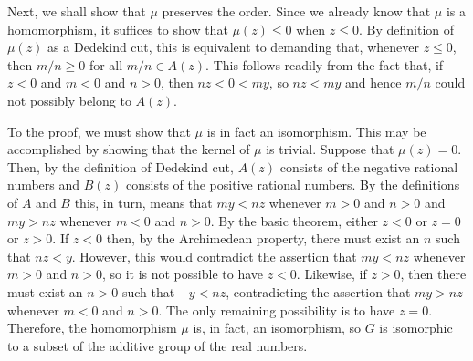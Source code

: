 \documentclass[12pt]{article}
\begin{document}
Next, we shall show that $\mu$ preserves the order.  Since we already know that $\mu$ is a homomorphism, it suffices to show that $\mu (z) \le 0$ when $z \le 0$.  By definition of $\mu (z)$ as a Dedekind cut, this is equivalent to demanding that, whenever $z \le 0$, then $m/n \ge 0$ for all $m/n \in A(z)$.  This follows readily from the fact that, if $z < 0$ and $m < 0$ and $n > 0$, then $nz < 0 < my$, so $nz < my$ and hence $m/n$ could not possibly belong to $A(z)$.

To  the proof, we must show that $\mu$ is in fact an isomorphism.  This may be accomplished by showing that the kernel of $\mu$ is trivial.  Suppose that $\mu (z) = 0$.  Then, by the definition of Dedekind cut, $A(z)$ consists of the negative rational numbers and $B(z)$ consists of the positive rational numbers.   By the definitions of $A$ and $B$ this, in turn, means that $my < nz$ whenever $m > 0$ and $n > 0$ and $my > nz$ whenever $m < 0$ and $n > 0$.  By the basic theorem, either $z < 0$ or $z = 0$ or $z > 0$.  If $z < 0$ then, by the Archimedean property, there must exist an $n$ such that $nz < y$.  However, this would contradict the assertion that $my < nz$ whenever $m > 0$ and $n > 0$, so it is not possible to have $z < 0$.  Likewise, if $z > 0$, then there must exist an $n > 0$ such that $-y < nz$, contradicting the assertion that $my > nz$ whenever $m < 0$ and $n > 0$.  The only remaining possibility is to have $z = 0$.  Therefore, the homomorphism $\mu$ is, in fact, an isomorphism, so $G$ is isomorphic to a subset of the additive group of the real numbers.
\end{document}
